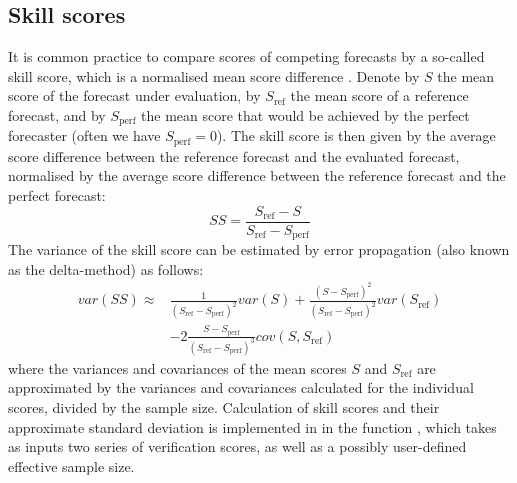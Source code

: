 \documentclass[article]{jss}\usepackage[]{graphicx}\usepackage[]{color}
\begin{document}
\subsection{Skill scores}

It is common practice to compare scores of competing forecasts by a so-called skill score, which is a normalised mean score difference \citep{wilks2011statistical}.
Denote by $S$ the mean score of the forecast under evaluation, by $S_{\text{ref}}$ the mean score of a reference forecast, and by $S_{\text{perf}}$ the mean score that would be achieved by the perfect forecaster (often we have $S_{\text{perf}}=0$).
The skill score is then given by the average score difference between the reference forecast and the evaluated forecast, normalised by the average score difference between the reference forecast and the perfect forecast:
%
\begin{equation}
SS = \frac{S_{\text{ref}} - S}{S_{\text{ref}} - S_{\text{perf}}}
\end{equation}
%
The variance of the skill score can be estimated by error propagation (also known as the delta-method) as follows:
%
\begin{align}
var(SS) \approx & \frac{1}{(S_{\text{ref}} - S_{\text{perf}})^2} var(S) + \frac{(S - S_{\text{perf}})^2}{(S_{\text{ref}}-S_{\text{perf}})^2} var(S_{\text{ref}})\nonumber\\
& - 2 \frac{S-S_{\text{perf}}}{(S_{\text{ref}}-S_{\text{perf}})^3} cov(S, S_{\text{ref}})
\end{align}
%
where the variances and covariances of the mean scores $S$ and $S_{\text{ref}}$ are approximated by the variances and covariances calculated for the individual scores, divided by the sample size.
Calculation of skill scores and their approximate standard deviation is implemented in  in the function , which takes as inputs two series of verification scores, as well as a possibly user-defined effective sample size.
\end{document}
